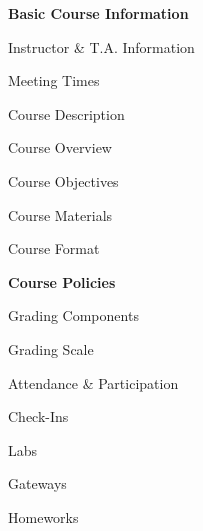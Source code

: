\documentclass[11pt,letterpaper]{article}
\begin{document}
\mytitle

\vspace{-0.2cm}


\begin{minipage}[t]{0.45\textwidth} %
{\bfseries\color{scred} Basic Course Information} \dotfill \pageref{course_info} \par
\hspace{0.3cm} Instructor \& T.A. Information \dotfill \pageref{instr_info} \par
\hspace{0.3cm} Meeting Times \dotfill \pageref{meetings} \par
\hspace{0.3cm} Course Description \dotfill \pageref{course_desc} \par
\hspace{0.3cm} Course Overview \dotfill \pageref{course_overview} \par
\hspace{0.3cm} Course Objectives \dotfill \pageref{course_obj} \par
\hspace{0.3cm} Course Materials \dotfill \pageref{course_mat} \par
\hspace{0.3cm} Course Format \dotfill \pageref{course_format} \par
{\bfseries\color{scred} Course Policies} \dotfill \pageref{course_policies} \par
\hspace{0.3cm} Grading Components \dotfill \pageref{grade_comp} \par
\hspace{0.3cm} Grading Scale \dotfill \pageref{grade_scale} \par
\hspace{0.3cm} Attendance \& Participation \dotfill \pageref{attend} \par
\hspace{0.3cm} Check-Ins \dotfill \pageref{check} \par
\hspace{0.3cm} Labs \dotfill \pageref{labs} \par
\hspace{0.3cm} Gateways \dotfill \pageref{gateways} \par
\hspace{0.3cm} Homeworks \dotfill \pageref{hw} \par

\end{minipage}
\end{document}
